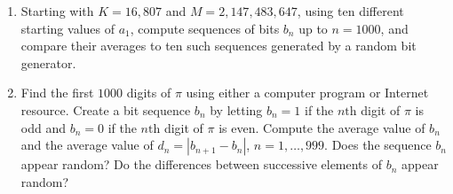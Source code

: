 \documentclass{exercises}
\begin{document}
\begin{enumerate}[resume]
\item \techrequired Starting with $K=16{,}807$ and $M=2{,}147{,}483{,}647$, using ten different starting values of $a_{1}$, compute sequences of bits $b_{n}$ up to $n=1000$, and compare their averages to ten such sequences generated by a random bit generator.
\item \techrequired Find the first $1000$ digits of $\pi$ using either a computer program or Internet resource. Create a bit sequence $b_{n}$ by letting $b_{n}=1$ if the $n\text{th}$ digit of $\pi$ is odd and $b_{n}=0$ if the $n\text{th}$ digit of $\pi$ is even. Compute the average value of $b_{n}$ and the average value of $d_{n}=|b_{n+1}-b_{n}|$, $n=1,\ldots,999$. Does the sequence $b_{n}$ appear random? Do the differences between successive elements of $b_{n}$ appear random?
\end{enumerate}
\end{document}
